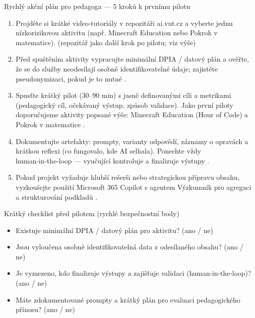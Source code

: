 \documentclass{report}%
\begin{document}
Rychlý akční plán pro pedagoga — 5 kroků k prvnímu pilotu
\begin{enumerate}
  \item Projděte si krátké video‑tutoriály v repozitáři ai.vut.cz a vyberte jednu nízkorizikovou aktivitu (např. Minecraft Education nebo Pokrok v matematice). (repozitář jako další krok po pilotu; viz výše)
  \item Před spuštěním aktivity vypracujte minimální DPIA / datový plán a ověřte, že se do služby neodesílají osobně identifikovatelné údaje; zajistěte pseudonymizaci, pokud je to nutné \cite{kb_malinka_chatgpt_ve_vyuce_dva_roky_pote_2024_pdf_90bc3aaf_page_12_1}.
  \item Spusťte krátký pilot (30–90 min) s jasně definovanými cíli a metrikami (pedagogický cíl, očekávaný výstup, způsob validace). Jako první piloty doporučujeme aktivity popsané výše: Minecraft Education (Hour of Code) a Pokrok v matematice \cite{kb_ai_101_tipu_pdf_04e4a115_page_15_2, kb_ai_101_tipu_pdf_04e4a115_page_8_1}.
  \item Dokumentujte artefakty: prompty, varianty odpovědí, záznamy o opravách a krátkou reflexi (co fungovalo, kde AI selhala). Ponechte vždy human‑in‑the‑loop — vyučující kontroluje a finalizuje výstupy \cite{kb_malinka_chatgpt_ve_vyuce_dva_roky_pote_2024_pdf_90bc3aaf_page_12_1}.
  \item Pokud projekt vyžaduje hlubší rešerši nebo strategickou přípravu obsahu, vyzkoušejte použití Microsoft 365 Copilot s agentem Výzkumník pro agregaci a strukturování podkladů \cite{kb_ai_101_tipu_pdf_04e4a115_page_48_1}.
\end{enumerate}

Krátký checklist před pilotem (rychlé bezpečnostní body)
\begin{itemize}
  \item Existuje minimální DPIA / datový plán pro aktivitu? (ano / ne) \cite{kb_malinka_chatgpt_ve_vyuce_dva_roky_pote_2024_pdf_90bc3aaf_page_12_1}
  \item Jsou vyloučena osobně identifikovatelná data z odesílaného obsahu? (ano / ne) \cite{kb_malinka_chatgpt_ve_vyuce_dva_roky_pote_2024_pdf_90bc3aaf_page_12_1}
  \item Je vymezeno, kdo finalizuje výstupy a zajišťuje validaci (human‑in‑the‑loop)? (ano / ne) \cite{kb_malinka_chatgpt_ve_vyuce_dva_roky_pote_2024_pdf_90bc3aaf_page_12_1}
  \item Máte zdokumentované prompty a krátký plán pro evaluaci pedagogického přínosu? (ano / ne)
\end{itemize}
\end{document}

